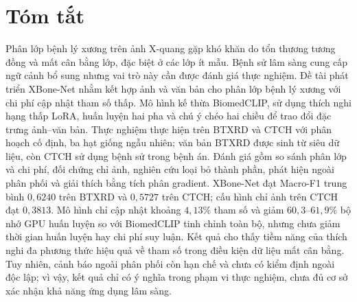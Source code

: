 \chapter*{Tóm tắt}

Phân lớp bệnh lý xương trên ảnh X-quang gặp khó khăn do tổn thương tương đồng và mất cân bằng lớp, đặc biệt ở các lớp ít mẫu. Bệnh sử lâm sàng cung cấp ngữ cảnh bổ sung nhưng vai trò này cần được đánh giá thực nghiệm. Đề tài phát triển XBone-Net nhằm kết hợp ảnh và văn bản cho phân lớp bệnh lý xương với chi phí cập nhật tham số thấp. Mô hình kế thừa BiomedCLIP, sử dụng thích nghi hạng thấp LoRA, huấn luyện hai pha và chú ý chéo hai chiều để trao đổi đặc trưng ảnh--văn bản. Thực nghiệm thực hiện trên BTXRD và CTCH với phân hoạch cố định, ba hạt giống ngẫu nhiên; văn bản BTXRD được sinh từ siêu dữ liệu, còn CTCH sử dụng bệnh sử trong bệnh án. Đánh giá gồm so sánh phân lớp và chi phí, đối chứng chỉ ảnh, nghiên cứu loại bỏ thành phần, phát hiện ngoài phân phối và giải thích bằng tích phân gradient. XBone-Net đạt Macro-F1 trung bình $0{,}6240$ trên BTXRD và $0{,}5727$ trên CTCH; cấu hình chỉ ảnh trên CTCH đạt $0{,}3813$. Mô hình chỉ cập nhật khoảng $4{,}13\%$ tham số và giảm $60{,}3\text{--}61{,}9\%$ bộ nhớ GPU huấn luyện so với BiomedCLIP tinh chỉnh toàn bộ, nhưng chưa giảm thời gian huấn luyện hay chi phí suy luận. Kết quả cho thấy tiềm năng của thích nghi đa phương thức hiệu quả về tham số trong điều kiện dữ liệu mất cân bằng. Tuy nhiên, cảnh báo ngoài phân phối còn hạn chế và chưa có kiểm định ngoài độc lập; vì vậy, kết quả chỉ có ý nghĩa trong phạm vi thực nghiệm, chưa đủ cơ sở xác nhận khả năng ứng dụng lâm sàng.
